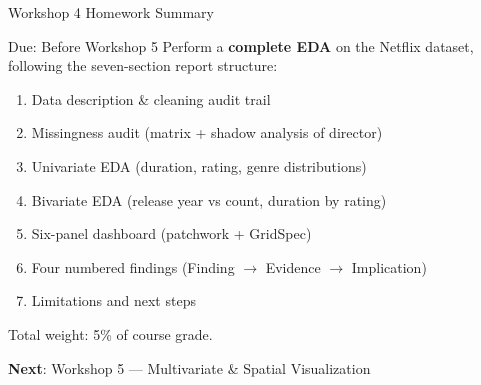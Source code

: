\documentclass[10pt]{beamer}
\begin{document}
\begin{frame}{Workshop 4 Homework Summary}
  \begin{alertblock}{Due: Before Workshop 5}
    Perform a \textbf{complete EDA} on the Netflix dataset, following
    the seven-section report structure:
    \begin{enumerate}
      \item Data description \& cleaning audit trail
      \item Missingness audit (matrix + shadow analysis of director)
      \item Univariate EDA (duration, rating, genre distributions)
      \item Bivariate EDA (release year vs count, duration by rating)
      \item Six-panel dashboard (patchwork + GridSpec)
      \item Four numbered findings (Finding $\rightarrow$ Evidence
            $\rightarrow$ Implication)
      \item Limitations and next steps
    \end{enumerate}
    Total weight: 5\% of course grade.
  \end{alertblock}
  \vspace{4pt}
  \textbf{Next}: Workshop 5 --- Multivariate \& Spatial Visualization
\end{frame}
\end{document}
